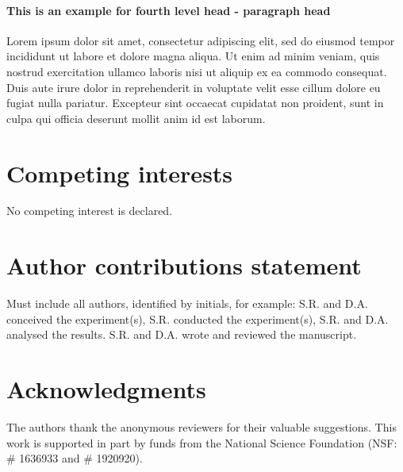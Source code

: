 \documentclass[unnumsec,webpdf,contemporary,large]{oup-authoring-template}%
\theoremstyle{thmstyleone}%
\theoremstyle{thmstyletwo}%
\theoremstyle{thmstylethree}%
\begin{document}
\paragraph{This is an example for fourth level head - paragraph head}

Lorem ipsum dolor sit amet, consectetur adipiscing elit, sed do eiusmod tempor incididunt ut labore et dolore magna aliqua. Ut enim ad minim veniam, quis nostrud exercitation ullamco laboris nisi ut aliquip ex ea commodo consequat. Duis aute irure dolor in reprehenderit in voluptate velit esse cillum dolore eu fugiat nulla pariatur. Excepteur sint occaecat cupidatat non proident, sunt in culpa qui officia deserunt mollit anim id est laborum.



\section{Competing interests}
No competing interest is declared.

\section{Author contributions statement}

Must include all authors, identified by initials, for example:
S.R. and D.A. conceived the experiment(s),  S.R. conducted the experiment(s), S.R. and D.A. analysed the results.  S.R. and D.A. wrote and reviewed the manuscript.

\section{Acknowledgments}
The authors thank the anonymous reviewers for their valuable suggestions. This work is supported in part by funds from the National Science Foundation (NSF: \# 1636933 and \# 1920920).





%
%



\end{document}
